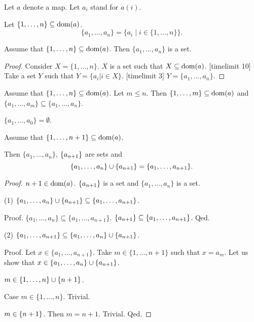 \documentclass[english,11pt]{article}
\newcommand{\Seq}[2]{\{#1,\dots,#2\}}
\newcommand{\FinSet}[3]{\{#1_{#2},\dots,#1_{#3}\}}
\begin{document}
\begin{forthel}
Let $a$ denote a map.
Let $a_{i}$ stand for $a(i)$.

\begin{definition}
Let $\Seq{1}{n} \subseteq \dom(a)$.
$$\FinSet{a}{1}{n} = \{ a_{i} \mid i \in \Seq{1}{n}\}.$$
\end{definition}


\begin{lemma}
Assume that $\Seq{1}{n} \subseteq \dom(a)$.
Then $\FinSet{a}{1}{n}$ is a set.
\end{lemma}
\begin{proof}
Consider $X = \Seq{1}{n}$. $X$ is a set such that $X \subseteq \operatorname{dom}(a)$.
[timelimit 10]
Take a set $Y$ such that $Y = \{ a_{i} | i \in X\}$.
[timelimit 3]
$Y = \FinSet{a}{1}{n}$.
\end{proof}


\begin{lemma}
Assume that $\Seq{1}{n} \subseteq \dom(a)$.
Let $m \leq n$. Then $\Seq{1}{m} \subseteq \dom(a)$ and
$\FinSet{a}{1}{m} \subseteq \FinSet{a}{1}{n}$.
\end{lemma}

\begin{lemma}
$\FinSet{a}{1}{0} = \emptyset$.
\end{lemma}

\begin{lemma}
Assume that $\Seq{1}{n+1} \subseteq \dom(a)$. 

Then
$\FinSet{a}{1}{n}$, $\{a_{n+1}\}$ are sets and
$$\FinSet{a}{1}{n} \cup \sing{a_{n+1}} = \FinSet{a}{1}{n+1}.$$
\end{lemma}
\begin{proof}
$n+1 \in \operatorname{dom}(a)$.
$\{a_{n+1}\}$ is a set and $\FinSet{a}{1}{n}$ is a set.

(1) $\FinSet{a}{1}{n} \cup \sing{a_{n+1}} \subseteq \FinSet{a}{1}{n+1}$.

Proof.
$\FinSet{a}{1}{n} \subseteq \FinSet{a}{1}{n+1}$.
$\sing{a_{n+1}}  \subseteq \FinSet{a}{1}{n+1}$.
Qed.

(2) $\FinSet{a}{1}{n+1} \subseteq \FinSet{a}{1}{n} \cup \sing{a_{n+1}}$.

Proof.
Let $x \in \FinSet{a}{1}{n+1}$. Take $m \in \Seq{1}{n+1}$ such that
$x = a_{m}$. Let us show that $x \in \FinSet{a}{1}{n} \cup \sing{a_{n+1}}$.

$m \in \Seq{1}{n} \cup \sing{n+1}$.

Case $m \in \Seq{1}{n}$. Trivial.

$m \in \{n+1\}$. Then $m = n+1$. Trivial.
Qed.


\end{proof}
\end{forthel}
\end{document}
